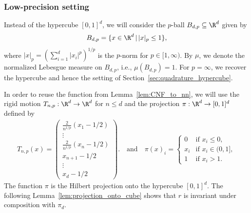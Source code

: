 \documentclass{amsart}[11pt]
\numberwithin{equation}{section}
\numberwithin{theorem}{section}
\begin{document}
\subsubsection{Low-precision setting}

Instead of the hypercube $[0, 1]^d$, we will consider the $p$-ball $B_{d, p} \subseteq \R^d$ given by
\begin{align*}
    B_{d, p} = \{x \in \R^d \, | \, |x|_p \leq 1\},
\end{align*}
where $|x|_p = \left(\sum_{i = 1}^d |x_i|^p\right)^{1/p}$ is the $p$-norm for $p \in [1, \infty)$. By $\mu$, we denote the normalized Lebesgue measure on $B_{d, p}$, i.e., $\mu(B_{d, p}) = 1$. For $p = \infty$, we recover the hypercube and hence the setting of Section~\ref{sec:quadrature_hypercube}.

In order to reuse the function from Lemma~\ref{lem:CNF_to_nn}, we will use the rigid motion $T_{n, p}: \R^d \to \R^d$ for $n \leq d$ and the projection $\pi: \R^d \to [0, 1]^d$ defined by
\begin{align*}
    T_{n, p}(x) = 
    \begin{pmatrix}
        \frac{2}{n^{1/p}}( x_1 - 1/2) \\
        \vdots \\
        \frac{2}{n^{1/p}}( x_n - 1/2)\\
         x_{n+1} - 1/2\\
         \vdots \\
        x_d - 1/2
    \end{pmatrix}.
\quad\text{and}\quad
    \pi(x)_i = 
    \begin{cases}
        0 & \text{if } x_i \leq 0, \\
        x_i & \text{if } x_i \in (0, 1], \\
        1 & \text{if } x_i > 1.
    \end{cases}
\end{align*}
 The function $\pi$ is the Hilbert projection onto the hypercube $[0, 1]^d$. The following Lemma~\ref{lem:projection_onto_cube} shows that $r$ is invariant under composition with $\pi_d$.
\end{document}
